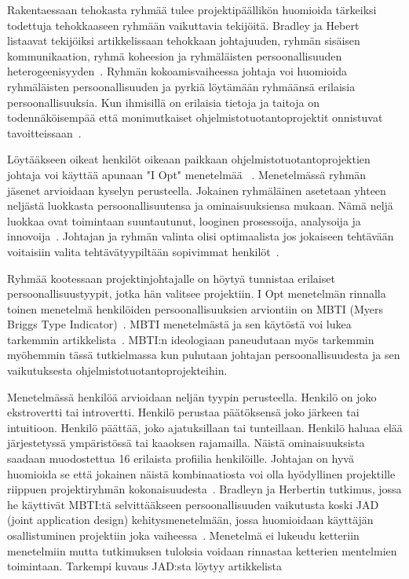 \documentclass[finnish]{tktltiki2}
\theoremstyle{definition}
\theoremstyle{remark}
\begin{document}
Rakentaessaan tehokasta ryhmää tulee projektipäällikön huomioida tärkeiksi todettuja tehokkaaseen ryhmään vaikuttavia tekijöitä. Bradley ja Hebert listaavat tekijöiksi artikkelissaan tehokkaan johtajuuden, ryhmän sisäisen kommunikaation, ryhmä koheesion ja ryhmäläisten persoonallisuuden heterogeenisyyden~\cite{bradley1997effect}. Ryhmän kokoamisvaiheessa johtaja voi huomioida ryhmäläisten persoonallisuuden ja pyrkiä löytämään ryhmäänsä erilaisia persoonallisuuksia. Kun ihmisillä on erilaisia tietoja ja taitoja on todennäköisempää että monimutkaiset ohjelmistotuotantoprojektit onnistuvat tavoitteissaan~\cite{bradley1997effect}.

Löytääkseen oikeat henkilöt oikeaan paikkaan ohjelmistotuotantoprojektien johtaja voi käyttää apunaan "I Opt" menetelmää ~\cite{Dhomne:2012:ITL:2382887.2382899, kliem1996teambuilding}. Menetelmässä ryhmän jäsenet arvioidaan kyselyn perusteella. Jokainen ryhmäläinen asetetaan yhteen neljästä luokkasta persoonallisuutensa ja ominaisuuksiensa mukaan. Nämä neljä luokkaa ovat toimintaan suuntautunut, looginen prosessoija, analysoija ja innovoija~\cite{ kliem1996teambuilding}. Johtajan ja ryhmän valinta olisi optimaalista jos jokaiseen tehtävään voitaisiin valita tehtävätyypiltään sopivimmat henkilöt~\cite{Dhomne:2012:ITL:2382887.2382899}.

Ryhmää kootessaan projektinjohtajalle on höytyä tunnistaa erilaiset persoonallisuustyypit, jotka hän valitsee projektiin. I Opt menetelmän rinnalla toinen menetelmä henkilöiden persoonallisuuksien arviontiin on MBTI (Myers Briggs Type Indicator)~\cite{bradley1997effect}. MBTI menetelmästä ja sen käytöstä voi lukea tarkemmin artikkelista~\cite{myers1985manual}. MBTI:n ideologiaan paneudutaan myös tarkemmin myöhemmin tässä tutkielmassa kun puhutaan johtajan persoonallisuudesta ja sen vaikutuksesta ohjelmistotuotantoprojekteihin.

Menetelmässä henkilöä arvioidaan neljän tyypin perusteella. Henkilö on joko ekstrovertti tai introvertti. Henkilö perustaa päätöksensä joko järkeen tai intuitioon. Henkilö päättää, joko ajatuksillaan tai tunteillaan. Henkilö haluaa elää järjestetyssä ympäristössä tai kaaoksen rajamailla. Näistä ominaisuuksista saadaan muodostettua 16 erilaista profiilia henkilöille. Johtajan on hyvä huomioida se että jokainen näistä kombinaatiosta voi olla hyödyllinen projektille riippuen projektiryhmän kokonaisuudesta~\cite{bradley1997effect}. Bradleyn ja Herbertin tutkimus, jossa he käyttivät MBTI:tä selvittääkseen persoonallisuuden vaikutusta koski JAD (joint application design) kehitysmenetelmään, jossa huomioidaan käyttäjän osallistuminen projektiin joka vaiheessa~\cite{bradley1997effect}. Menetelmä ei lukeudu ketteriin menetelmiin mutta tutkimuksen tuloksia voidaan rinnastaa ketterien mentelmien toimintaan. Tarkempi kuvaus JAD:sta löytyy artikkelista~\cite{Davidson1999215}
\end{document}
